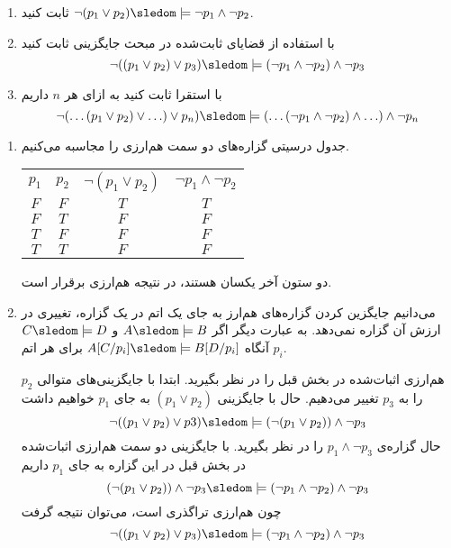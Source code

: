 \begin{enumerate}[label=(\alph*)]
  \item
  ثابت کنید
  $\neg(p_1\vee p_2)\sledom\models\neg p_1\wedge\neg p_2$.
  
  \item
  با استفاده از قضایای ثابت‌شده در مبحث جایگزینی ثابت کنید
  $$\neg((p_1\vee p_2)\vee p_3)\sledom\models (\neg p_1 \wedge \neg p_2)\wedge\neg p_3$$
  
  \item
  با استقرا ثابت کنید به ازای هر $n$ داریم
  $$\neg(\ldots(p_1\vee p_2)\vee \ldots)\vee p_n)\sledom\models (\ldots(\neg p_1\wedge \neg p_2)\wedge\ldots)\wedge\neg p_n$$
  \end{enumerate}\quad\vspace{-9mm}
  \begin{ans}
    \begin{enumerate}
      \item جدول درسیتی گزاره‌های دو سمت هم‌ارزی را مجاسبه می‌کنیم.
      \begin{LTR}
        \begin{tabular}{| c | c | c | c |}
          $p_1$ & $p_2$ & $\neg (p_1 \vee p_2)$ & $\neg p_1 \wedge \neg p_2$ \\
          $F$ & $F$ & $T$ & $T$ \\
          $F$ & $T$ & $F$ & $F$ \\
          $T$ & $F$ & $F$ & $F$ \\
          $T$ & $T$ & $F$ & $F$
        \end{tabular}
      \end{LTR}
      دو ستون آخر یکسان هستند، در نتیجه هم‌ارزی برقرار است.
  
      \item
      می‌دانیم جایگزین کردن گزاره‌های هم‌ارز به جای یک اتم در یک گزاره، تغییری در ارزش آن گزاره نمی‌دهد. به عبارت دیگر اگر
      $A \sledom\models B$ و
      $C \sledom\models D$
      آنگاه
      $A[C/p_i] \sledom\models B[D/p_i]$
      برای هر اتم $p_i$.
  
      هم‌ارزی اثبات‌شده در بخش قبل را در نظر بگیرید. ابتدا با جایگزینی‌های متوالی $p_2$ را به $p_3$ تغییر می‌دهیم.
      حال با جایگزینی
      $(p_1 \vee p_2)$
      به جای
      $p_1$
      خواهیم داشت
      $$ \neg ((p_1 \vee p_2) \vee p3) \sledom\models (\neg (p_1 \vee p_2)) \wedge \neg p_3 $$
      حال گزاره‌ی
      $p_1 \wedge \neg p_3$
      را در نظر بگیرید. با جایگزینی دو سمت هم‌ارزی اثبات‌شده در بخش قبل در این گزاره به جای
      $p_1$
      داریم
      $$ (\neg (p_1 \vee p_2)) \wedge \neg p_3 \sledom\models (\neg p_1 \wedge \neg p_2) \wedge \neg p_3 $$
      چون هم‌ارزی تراگذری است، می‌توان نتیجه گرفت
      $$ \neg((p_1\vee p_2)\vee p_3)\sledom\models (\neg p_1 \wedge \neg p_2)\wedge\neg p_3 $$
  

\end{enumerate}
\end{ans}
